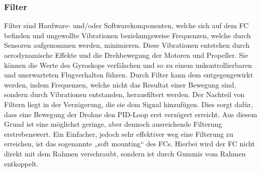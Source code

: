         \subsubsection[Filter]{Filter}
        Filter sind Hardware- und/oder Softwarekomponenten, welche sich auf dem FC befinden und ungewollte Vibrationen beziehungsweise Frequenzen, welche durch Sensoren aufgenommen werden, minimieren. Diese Vibrationen entstehen durch aerodynamische Effekte und die Drehbewegung der Motoren und Propeller. Sie können die Werte des Gyroskops verfälschen und so zu einem unkontrollierbaren und unerwarteten Flugverhalten führen. Durch Filter kann dem entgegengewirkt werden, indem Frequenzen, welche nicht das Resultat einer Bewegung sind, sondern durch Vibrationen entstanden, herausfiltert werden. Der Nachteil von Filtern liegt in der Verzögerung, die sie dem Signal hinzufügen. Dies sorgt dafür, dass eine Bewegung der Drohne den PID-Loop erst verzögert erreicht. Aus diesem Grund ist eine möglichst geringe, aber dennoch ausreichende Filterung erstrebenswert. Ein Einfacher, jedoch sehr effektiver weg eine Filterung zu erreichen, ist das sogenannte „soft mounting“ des FCs. Hierbei wird der FC nicht direkt mit dem Rahmen verschraubt, sondern ist durch Gummis vom Rahmen entkoppelt.
         
